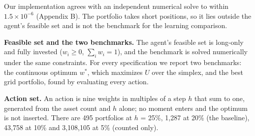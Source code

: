 \documentclass[
  11pt]{article}
\begin{document}
Our implementation agrees with an independent numerical solve to within
\(1.5 \times 10^{-6}\) (Appendix B). The portfolio takes short
positions, so it lies outside the agent's feasible set and is not the
benchmark for the learning comparison.

\textbf{Feasible set and the two benchmarks.} The agent's feasible set
is long-only and fully invested (\(w_i \ge 0\), \(\sum_i w_i = 1\)), and
the benchmark is solved numerically under the same constraints. For
every specification we report two benchmarks: the continuous optimum
\(w^*\), which maximizes \(U\) over the simplex, and the best grid
portfolio, found by evaluating every action.

\textbf{Action set.} An action is nine weights in multiples of a step
\(h\) that sum to one, generated from the asset count and \(h\) alone;
no moment enters and the optimum is not inserted. There are 495
portfolios at \(h\) = 25\%, 1,287 at 20\% (the baseline), 43,758 at 10\%
and 3,108,105 at 5\% (counted only).
\end{document}
